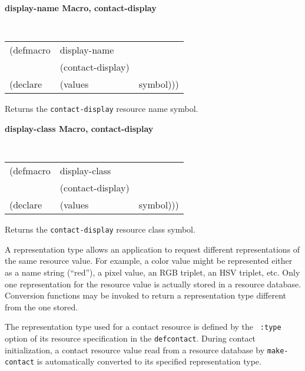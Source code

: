 {\samepage
{\large {\bf display-name \hfill Macro, contact-display}} 
\begin{flushright} \parbox[t]{6.125in}{
\tt
\begin{tabular}{lll}
\raggedright
(defmacro & display-name & \\ 
& (contact-display) \\
(declare &(values  & symbol)))
\end{tabular}
\rm

}\end{flushright}}
\begin{flushright} \parbox[t]{6.125in}{
Returns the {\tt contact-display} resource name symbol.

}\end{flushright}

{\samepage
{\large {\bf display-class \hfill Macro, contact-display}} 
\begin{flushright} \parbox[t]{6.125in}{
\tt
\begin{tabular}{lll}
\raggedright
(defmacro & display-class & \\ 
& (contact-display) \\
(declare &(values  & symbol)))
\end{tabular}
\rm

}\end{flushright}}
\begin{flushright} \parbox[t]{6.125in}{
Returns the {\tt contact-display} resource class symbol.

}\end{flushright}


A representation type  allows an application to 
request different representations of the same resource value. For example, a
color value might be represented either as a name string (``red''), a pixel
value, an RGB
triplet, an HSV triplet, etc. Only one representation for the resource value is
actually stored in a resource database. Conversion functions may be invoked
to return a representation type different from the one stored.

The representation type used for a contact resource is defined by the {\tt
:type} option of its resource specification in the {\tt defcontact}.  During
contact initialization, a contact resource value read from a resource
database by {\tt make-contact}
is automatically converted
to its specified representation type.

